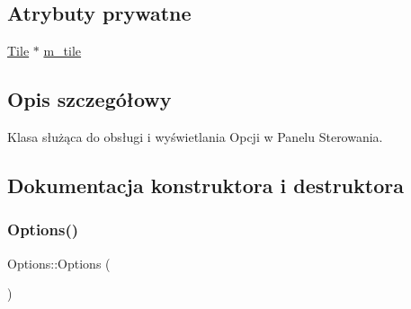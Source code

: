 \subsection*{Atrybuty prywatne}
\begin{DoxyCompactItemize}
\item 
\mbox{\hyperlink{class_tile}{Tile}} $\ast$ \mbox{\hyperlink{class_options_a5bed080c76f38af4f624fc17a437427b}{m\+\_\+tile}}
\end{DoxyCompactItemize}


\subsection{Opis szczegółowy}
Klasa służąca do obsługi i wyświetlania Opcji w Panelu Sterowania. 

\subsection{Dokumentacja konstruktora i destruktora}
\mbox{\label{class_options_ab72fb640172a6109e34c8a5366563753}} 
\subsubsection{\texorpdfstring{Options()}{Options()}}
{\footnotesize\ttfamily Options\+::\+Options (\begin{DoxyParamCaption}{ }\end{DoxyParamCaption})}

